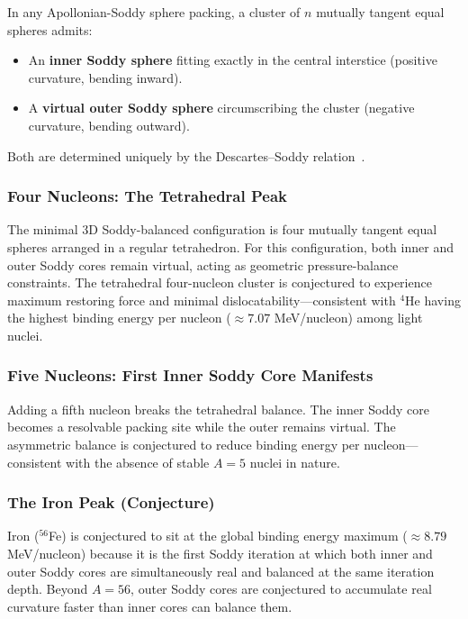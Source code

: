 \documentclass[11pt,a4paper]{article}
\begin{document}
    In any Apollonian-Soddy sphere packing, a cluster of $n$ mutually tangent equal spheres admits:
    \begin{itemize}
      \item An \textbf{inner Soddy sphere} fitting exactly in the central interstice (positive curvature, bending inward).
      \item A \textbf{virtual outer Soddy sphere} circumscribing the cluster (negative curvature, bending outward).
    \end{itemize}
    Both are determined uniquely by the Descartes--Soddy relation~\cite{Soddy1936,Boyd1973,Graham2003}.

  \subsubsection{Four Nucleons: The Tetrahedral Peak}

    The minimal 3D Soddy-balanced configuration is four mutually tangent equal spheres arranged in a regular tetrahedron. For this configuration, both inner and outer Soddy cores remain virtual, acting as geometric pressure-balance constraints. The tetrahedral four-nucleon cluster is conjectured to experience maximum restoring force and minimal dislocatability---consistent with $^4$He having the highest binding energy per nucleon ($\approx 7.07$ MeV/nucleon) among light nuclei.

  \subsubsection{Five Nucleons: First Inner Soddy Core Manifests}

    Adding a fifth nucleon breaks the tetrahedral balance. The inner Soddy core becomes a resolvable packing site while the outer remains virtual. The asymmetric balance is conjectured to reduce binding energy per nucleon---consistent with the absence of stable $A=5$ nuclei in nature.

  \subsubsection{The Iron Peak (Conjecture)}

    Iron ($^{56}$Fe) is conjectured to sit at the global binding energy maximum ($\approx 8.79$ MeV/nucleon) because it is the first Soddy iteration at which both inner and outer Soddy cores are simultaneously real and balanced at the same iteration depth. Beyond $A=56$, outer Soddy cores are conjectured to accumulate real curvature faster than inner cores can balance them.
\end{document}
